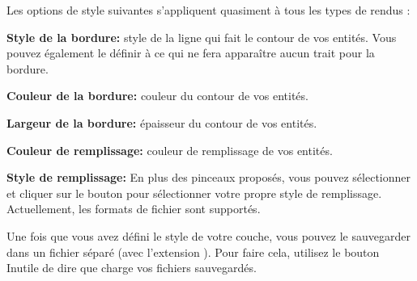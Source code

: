 Les options de style suivantes s'appliquent quasiment à tous les types de rendus :
\begin{description}
\item \textbf{Style de la bordure:} style de la ligne qui fait le contour de vos entités. Vous pouvez également le définir à  ce qui ne fera apparaître aucun trait pour la bordure.
\item \textbf{Couleur de la bordure:} couleur du contour de vos entités.
\item \textbf{Largeur de la bordure:} épaisseur du contour de vos entités.
\item \textbf{Couleur de remplissage:} couleur de remplissage de vos entités.
\item \textbf{Style de remplissage:} En plus des pinceaux proposés, vous pouvez sélectionner  et cliquer sur le bouton \browsebutton pour sélectionner votre propre style de remplissage. Actuellement, les formats de fichier  sont supportés.
\end{description}

Une fois que vous avez défini le style de votre couche, vous pouvez le sauvegarder dans un fichier séparé (avec l'extension ). Pour faire cela, utilisez le bouton  Inutile de dire que  charge vos fichiers sauvegardés.

